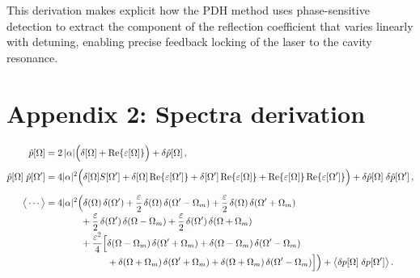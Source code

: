 \bigskip

This derivation makes explicit how the PDH method uses phase-sensitive detection to extract the component of the reflection coefficient that varies linearly with detuning, enabling precise feedback locking of the laser to the cavity resonance.

\chapter*{Appendix 2: Spectra derivation  }\label{app:spectra}

\begin{align}
\hat p[\Omega]
&= 2\,|\alpha| \Big( \delta[\Omega] + \Re\{\varepsilon[\Omega]\} \Big)
  + \delta \hat p[\Omega] \,,
\\[4pt]
\hat p[\Omega]\;\hat p[\Omega']
&= 4|\alpha|^{2}\Big(
      \delta[\Omega]S[\Omega']
    + \delta[\Omega]\Re\{\varepsilon[\Omega']\}
    + \delta[\Omega']\Re\{\varepsilon[\Omega]\}
    + \Re\{\varepsilon[\Omega]\}\Re\{\varepsilon[\Omega']\}
  \Big)
  + \delta \hat p[\Omega]\;\delta \hat p[\Omega'] \,,
\\[6pt]
\big\langle \cdots \big\rangle
&= 4|\alpha|^{2}\Big(
      \delta(\Omega)\,\delta(\Omega')
    + \frac{\varepsilon}{2}\,\delta(\Omega)\,\delta(\Omega'-\Omega_m)
    + \frac{\varepsilon}{2}\,\delta(\Omega)\,\delta(\Omega'+\Omega_m)
\\[-2pt]&\hphantom{= 4|\alpha|^{2}\Big(}
    + \frac{\varepsilon}{2}\,\delta(\Omega')\,\delta(\Omega-\Omega_m)
    + \frac{\varepsilon}{2}\,\delta(\Omega')\,\delta(\Omega+\Omega_m)
\\[-2pt]&\hphantom{= 4|\alpha|^{2}\Big(}
    + \frac{\varepsilon^{2}}{4}\Big[
          \delta(\Omega-\Omega_m)\,\delta(\Omega'+\Omega_m)
        + \delta(\Omega-\Omega_m)\,\delta(\Omega'-\Omega_m)
\\[-2pt]&\hphantom{= 4|\alpha|^{2}\Big(+ \frac{\varepsilon^{2}}{4}\Big[}
        + \delta(\Omega+\Omega_m)\,\delta(\Omega'+\Omega_m)
        + \delta(\Omega+\Omega_m)\,\delta(\Omega'-\Omega_m)
      \Big]
  \Big)
  + \big\langle \delta p[\Omega]\;\delta p[\Omega'] \big\rangle \,.
\end{align}
